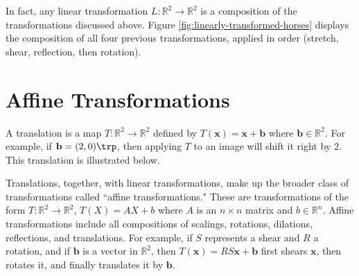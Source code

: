 In fact, any linear transformation $L:\mathbb{R}^2 \rightarrow\mathbb{R}^2$ is a composition of the transformations discussed above.
Figure \ref{fig:linearly-transformed-horses} displays the composition of all four previous transformations, applied in order (stretch, shear, reflection, then rotation).

\section*{Affine Transformations} %

A translation is a map $T: \mathbb{R}^2 \rightarrow \mathbb{R}^2$ defined by $T(\mathbf{x}) = \mathbf{x}+\mathbf{b}$ where $\mathbf{b} \in \mathbb{R}^2$.
For example, if $\mathbf{b} = (2, 0)\trp$, then applying $T$ to an image will shift it right by 2.
This translation is illustrated below.

Translations, together, with linear transformations, make up the broader class of transformations called ``affine transformations."
These are transformations of the form $T: \mathbb{R}^2 \to \mathbb{R}^2$, $T(X) = AX + b$ where $A$ is an $n\times n$ matrix and $b \in \mathbb{R}^n$.
Affine transformations include all compositions of scalings, rotations, dilations, reflections, and translations.
For example, if $S$ represents a shear and $R$ a rotation, and if $\mathbf{b}$ is a vector in $\mathbb{R}^2$, then $T(\mathbf{x}) = RS\mathbf{x} + \mathbf{b}$ first shears $\mathbf{x}$, then rotates it, and finally translates it by $\mathbf{b}$.


